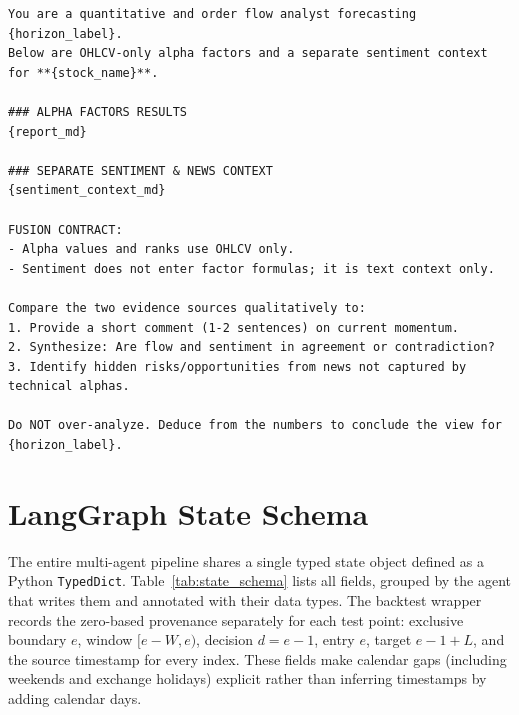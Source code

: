 \begin{framed}
\begin{small}
\begin{verbatim}
You are a quantitative and order flow analyst forecasting {horizon_label}.
Below are OHLCV-only alpha factors and a separate sentiment context
for **{stock_name}**.

### ALPHA FACTORS RESULTS
{report_md}

### SEPARATE SENTIMENT & NEWS CONTEXT
{sentiment_context_md}

FUSION CONTRACT:
- Alpha values and ranks use OHLCV only.
- Sentiment does not enter factor formulas; it is text context only.

Compare the two evidence sources qualitatively to:
1. Provide a short comment (1-2 sentences) on current momentum.
2. Synthesize: Are flow and sentiment in agreement or contradiction?
3. Identify hidden risks/opportunities from news not captured by technical alphas.

Do NOT over-analyze. Deduce from the numbers to conclude the view for {horizon_label}.
\end{verbatim}
\end{small}
\end{framed}


\section{LangGraph State Schema}
\label{app:state_schema}

The entire multi-agent pipeline shares a single typed state object defined as a Python \texttt{TypedDict}. Table~\ref{tab:state_schema} lists all fields, grouped by the agent that writes them and annotated with their data types.  The backtest wrapper records the zero-based provenance separately for each test point: exclusive boundary $e$, window $[e-W,e)$, decision $d=e-1$, entry $e$, target $e-1+L$, and the source timestamp for every index.  These fields make calendar gaps (including weekends and exchange holidays) explicit rather than inferring timestamps by adding calendar days.

